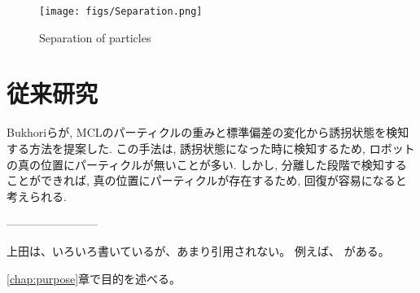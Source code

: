 \begin{figure}[h]
         \begin{center}
         \texttt{[image: figs/Separation.png]}
         \caption{Separation of particles}
         \label{fig:Separation}
         \end{center}
\end{figure}



\section{従来研究}

Bukhoriらが, MCLのパーティクルの重みと標準偏差の変化から誘拐状態を検知する方法を提案した.\cite{Bukhori2015}
この手法は, 誘拐状態になった時に検知するため, ロボットの真の位置にパーティクルが無いことが多い.
しかし, 分離した段階で検知することができれば, 真の位置にパーティクルが存在するため, 回復が容易になると考えられる.














------------------------


上田は、いろいろ書いているが、あまり引用されない。
例えば、\cite{上田2015gihyo,ueda2015,上田2015jsai}
がある。

\ref{chap:purpose}章で目的を述べる。

%
